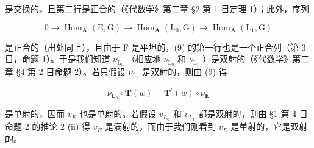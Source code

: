 是交换的，且第二行是正合的（《代数学》第二章 §2 第 1 目定理 1）；此外，序列

\[
0 \rightarrow \operatorname{Hom} _ {\mathbf {A}} (\mathrm{E}, \mathrm{G}) \rightarrow \operatorname{Hom} _ {\mathbf {A}} (\mathrm{L} _ {0}, \mathrm{G}) \rightarrow \operatorname{Hom} _ {\mathbf {A}} (\mathrm{L} _ {1}, \mathrm{G})
\]

是正合的（出处同上），且由于 F 是平坦的，(9) 的第一行也是一个正合列（第 3 目，命题 1）。于是我们知道 \(\nu_{\mathrm{L}_0}\) （相应地 \(\nu_{\mathrm{L}_0}\) 和 \(\nu_{\mathrm{L}_1}\) ）是双射的（《代数学》第二章 §4 第 2 目命题 2）。若只假设 \(\nu_{\mathrm{L}_0}\) 是双射的，则由 (9) 得

\[
\nu_ {\mathbf {L} _ {0}} \circ \mathbf {T} (w) = \mathbf {T} ^ {\prime} (w) \circ \nu_ {\mathbf {E}}
\]

是单射的，因而 \(v_{E}\) 也是单射的。若假设 \(v_{L_{0}}\) 和 \(v_{L_{1}}\) 都是双射的，则由 §1 第 4 目命题 2 的推论 2 (ii) 得 \(v_{E}\) 是满射的，而由于我们刚看到 \(v_{E}\) 是单射的，它是双射的。

